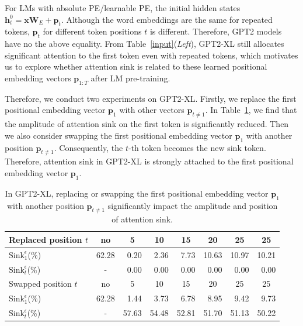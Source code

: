 \documentclass{article} \usepackage{iclr2025_conference,times}
\begin{document}
For LMs with absolute PE/learnable PE, the initial hidden states $\boldsymbol{h}_t^0=\boldsymbol{x}\boldsymbol{W}_E+\boldsymbol{p}_t$. Although the word embeddings are the same for repeated tokens, $\boldsymbol{p}_t$ for different token positions $t$ is different. Therefore, GPT2 models have no the above equality. From Table~\ref{input}(\emph{Left}), GPT2-XL still allocates significant attention to the first token even with repeated tokens, which motivates us to explore whether attention sink is related to these learned positional embedding vectors $\boldsymbol{p}_{1:T}$ after LM pre-training.

Therefore, we conduct two experiments on GPT2-XL. Firstly, we replace the first positional embedding vector $\boldsymbol{p}_1$ with other vectors $\boldsymbol{p}_{t\neq 1}$. In Table~\ref{learnable_pe}, we find that the amplitude of attention sink on the first token is significantly reduced. Then we also consider swapping the first positional embedding vector $\boldsymbol{p}_1$ with another position $\boldsymbol{p}_{t\neq 1}$. Consequently, the $t$-th token becomes the new sink token. Therefore, attention sink in GPT2-XL is strongly attached to the first positional embedding vector $\boldsymbol{p}_1$.


\begin{table}[htbp]
\caption{{In GPT2-XL, replacing or swapping the first positional embedding vector $\boldsymbol{p}_1$ with another position $\boldsymbol{p}_{t\neq 1}$ significantly impact the amplitude and position of attention sink.}}
\vspace{-.2cm}
\begin{center}
\begin{tabular}{l|ccccccc}
\toprule
Replaced position $t$ & no & 5 & 10 & 15 & 20 & 25 & 25 \\
\midrule
$\textrm{Sink}_1^{\epsilon}$(\%) & 62.28 & \,\,\,0.20 & \,\,\,2.36 & \,\,\,7.73 & 10.63 & 10.97 & 10.21 \\
$\textrm{Sink}_t^{\epsilon}$(\%) & - &  \,\,\,0.00 & \,\,\,0.00 & \,\,\,0.00 & \,\,\,0.00 & \,\,\,0.00 & \,\,\,0.00\\
\midrule
Swapped position $t$ & no & 5 & 10 & 15 & 20 & 25 & 25 \\
\midrule
$\textrm{Sink}_1^{\epsilon}$(\%) & 62.28 & \,\,\,1.44 & \,\,\,3.73 & \,\,\,6.78 & \,\,\,8.95 & \,\,\,9.42 & \,\,\,9.73 \\
$\textrm{Sink}_t^{\epsilon}$(\%) &  - & 57.63 & 54.48 & 52.81 & 51.70 & 51.13 & 50.22 \\
\bottomrule
\end{tabular}
\end{center}
\vspace{-.2cm}
\label{learnable_pe}
\end{table}
\end{document}
